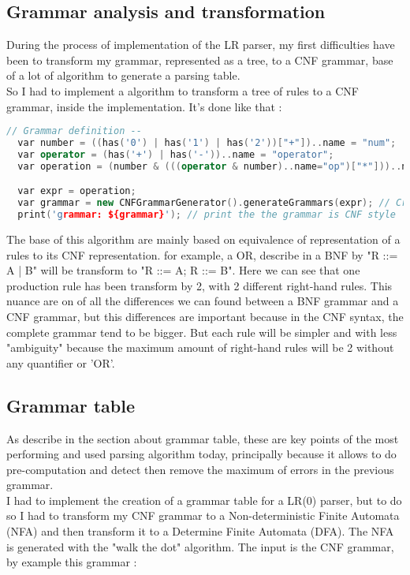 \subsection{Grammar analysis and transformation}
During the process of implementation of the LR parser, my first difficulties have been to transform my grammar, represented as a tree, to a CNF grammar, base of a lot of algorithm to generate a parsing table.\\
So I had to implement a algorithm to transform a tree of rules to a CNF grammar, inside the implementation. It's done like that :
\begin{lstlisting}[language=C++, caption=Transform grammar to its CNF representation]
  // Grammar definition --
  var number = ((has('0') | has('1') | has('2'))["+"])..name = "num";
  var operator = (has('+') | has('-'))..name = "operator";
  var operation = (number & (((operator & number)..name="op")["*"]))..name = "operation";

  var expr = operation;
  var grammar = new CNFGrammarGenerator().generateGrammars(expr); // Creation of the CNF representation of the grammar
  print('grammar: ${grammar}'); // print the the grammar is CNF style
\end{lstlisting}

The base of this algorithm are mainly based on equivalence of representation of a rules to its CNF representation. for example, a OR, describe in a BNF by "R ::= A | B" will be transform to "R ::= A; R ::= B". Here we can see that one production rule has been transform by 2, with 2 different right-hand rules. This nuance are on of all the differences we can found between a BNF grammar and a CNF grammar, but this differences are important because in the CNF syntax, the complete grammar tend to be bigger. But each rule will be simpler and with less "ambiguity" because the maximum amount of right-hand rules will be 2 without any quantifier or 'OR'.

\subsection{Grammar table}
As describe in the section about grammar table, these are key points of the most performing and used parsing algorithm today, principally because it allows to do pre-computation and detect then remove the maximum of errors in the previous grammar.\\
I had to implement the creation of a grammar table for a LR(0) parser, but to do so I had to transform my CNF grammar to a Non-deterministic Finite Automata (NFA) and then transform it to a Determine Finite Automata (DFA). The NFA is generated with the "walk the dot" algorithm. The input is the CNF grammar, by example this grammar :

